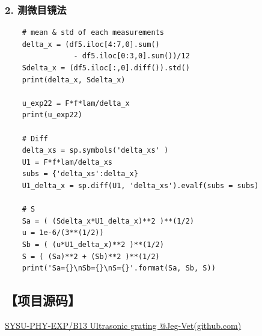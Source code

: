\documentclass[12pt,a4paper,UTF8]{ctexart}
\begin{document}
\subsubsection*{2. 测微目镜法}
\label{sec:code2}
\begin{lstlisting}
	# mean & std of each measurements
	delta_x = (df5.iloc[4:7,0].sum() 
	            - df5.iloc[0:3,0].sum())/12 
	Sdelta_x = (df5.iloc[:,0].diff()).std()
	print(delta_x, Sdelta_x)
	
	u_exp22 = F*f*lam/delta_x
	print(u_exp22)
	
	# Diff
	delta_xs = sp.symbols('delta_xs' ) 
	U1 = F*f*lam/delta_xs
	subs = {'delta_xs':delta_x} 
	U1_delta_x = sp.diff(U1, 'delta_xs').evalf(subs = subs)
	
	# S
	Sa = ( (Sdelta_x*U1_delta_x)**2 )**(1/2)
	u = 1e-6/(3**(1/2)) 
	Sb = ( (u*U1_delta_x)**2 )**(1/2)
	S = ( (Sa)**2 + (Sb)**2 )**(1/2)
	print('Sa={}\nSb={}\nS={}'.format(Sa, Sb, S))
\end{lstlisting}

\subsection*{【项目源码】}
\href{https://github.com/Jeg-Vet/SYSU-PHY-EXP/tree/main/B13-Ultrasonic_grating}{SYSU-PHY-EXP/B13 Ultrasonic grating @Jeg-Vet(github.com)}
\end{document}
